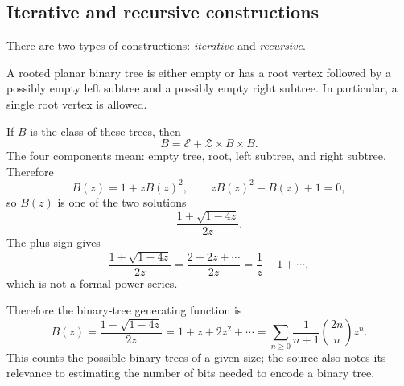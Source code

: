 \subsection{Iterative and recursive constructions}
There are two types of constructions: \textit{iterative} and \textit{recursive}.
\begin{example}
A rooted planar binary tree is either empty or has a root vertex followed by a possibly empty left subtree and a possibly empty right subtree. In particular, a single root vertex is allowed.

If $B$ is the class of these trees, then
\[
B=\mathcal E+\mathcal Z\times B\times B.
\]
The four components mean: empty tree, root, left subtree, and right subtree. Therefore
\[
B(z)=1+zB(z)^2,
\qquad zB(z)^2-B(z)+1=0,
\]
so $B(z)$ is one of the two solutions
\[
\frac{1\pm\sqrt{1-4z}}{2z}.
\]
The plus sign gives
\[
\frac{1+\sqrt{1-4z}}{2z}
=\frac{2-2z+\cdots}{2z}=\frac1z-1+\cdots,
\]
which is not a formal power series.
\end{example}
Therefore the binary-tree generating function is
\[
B(z)=\frac{1-\sqrt{1-4z}}{2z}
=1+z+2z^2+\cdots
=\sum_{n\ge0}\frac1{n+1}\binom{2n}{n}z^n.
\]
This counts the possible binary trees of a given size; the source also notes its relevance to estimating the number of bits needed to encode a binary tree.
